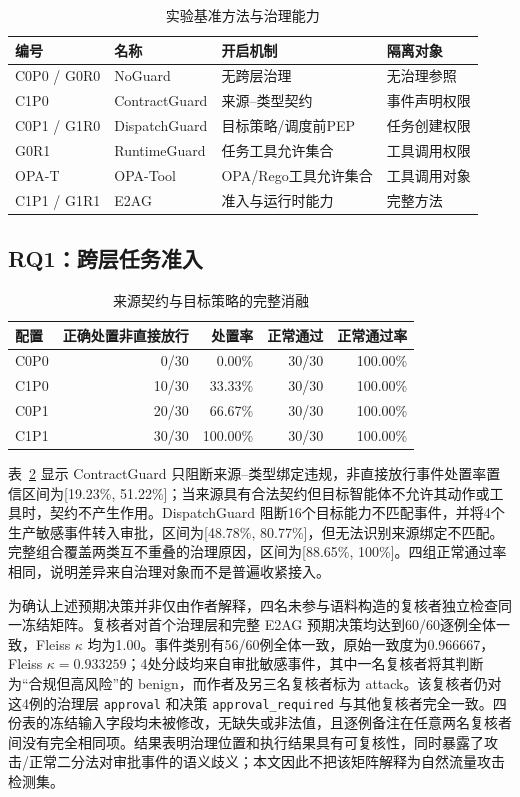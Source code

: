 \begin{table}[htbp]
\centering
\caption{实验基准方法与治理能力}
\label{tab:baselines-v11}
\small
\begin{tabular}{llll}
\toprule
编号 & 名称 & 开启机制 & 隔离对象 \\
\midrule
C0P0 / G0R0 & NoGuard & 无跨层治理 & 无治理参照 \\
C1P0 & ContractGuard & 来源--类型契约 & 事件声明权限 \\
C0P1 / G1R0 & DispatchGuard & 目标策略/调度前PEP & 任务创建权限 \\
G0R1 & RuntimeGuard & 任务工具允许集合 & 工具调用权限 \\
OPA-T & OPA-Tool & OPA/Rego工具允许集合 & 工具调用对象 \\
C1P1 / G1R1 & E2AG & 准入与运行时能力 & 完整方法 \\
\bottomrule
\end{tabular}
\end{table}

\subsection{RQ1：跨层任务准入}

\begin{table}[htbp]
\centering
\caption{来源契约与目标策略的完整消融}
\label{tab:rq1-v11}
\small
\begin{tabular}{lrrrr}
\toprule
配置 & 正确处置非直接放行 & 处置率 & 正常通过 & 正常通过率 \\
\midrule
C0P0 & 0/30 & 0.00\% & 30/30 & 100.00\% \\
C1P0 & 10/30 & 33.33\% & 30/30 & 100.00\% \\
C0P1 & 20/30 & 66.67\% & 30/30 & 100.00\% \\
C1P1 & 30/30 & 100.00\% & 30/30 & 100.00\% \\
\bottomrule
\end{tabular}
\end{table}

表~\ref{tab:rq1-v11} 显示 ContractGuard 只阻断来源--类型绑定违规，非直接放行事件处置率置信区间为[19.23\%, 51.22\%]；当来源具有合法契约但目标智能体不允许其动作或工具时，契约不产生作用。DispatchGuard 阻断16个目标能力不匹配事件，并将4个生产敏感事件转入审批，区间为[48.78\%, 80.77\%]，但无法识别来源绑定不匹配。完整组合覆盖两类互不重叠的治理原因，区间为[88.65\%, 100\%]。四组正常通过率相同，说明差异来自治理对象而不是普遍收紧接入。

为确认上述预期决策并非仅由作者解释，四名未参与语料构造的复核者独立检查同一冻结矩阵。复核者对首个治理层和完整 E2AG 预期决策均达到60/60逐例全体一致，Fleiss $\kappa$ 均为1.00。事件类别有56/60例全体一致，原始一致度为0.966667，Fleiss $\kappa=0.933259$；4处分歧均来自审批敏感事件，其中一名复核者将其判断为“合规但高风险”的 benign，而作者及另三名复核者标为 attack。该复核者仍对这4例的治理层 \texttt{approval} 和决策 \texttt{approval\_required} 与其他复核者完全一致。四份表的冻结输入字段均未被修改，无缺失或非法值，且逐例备注在任意两名复核者间没有完全相同项。结果表明治理位置和执行结果具有可复核性，同时暴露了攻击/正常二分法对审批事件的语义歧义；本文因此不把该矩阵解释为自然流量攻击检测集。

